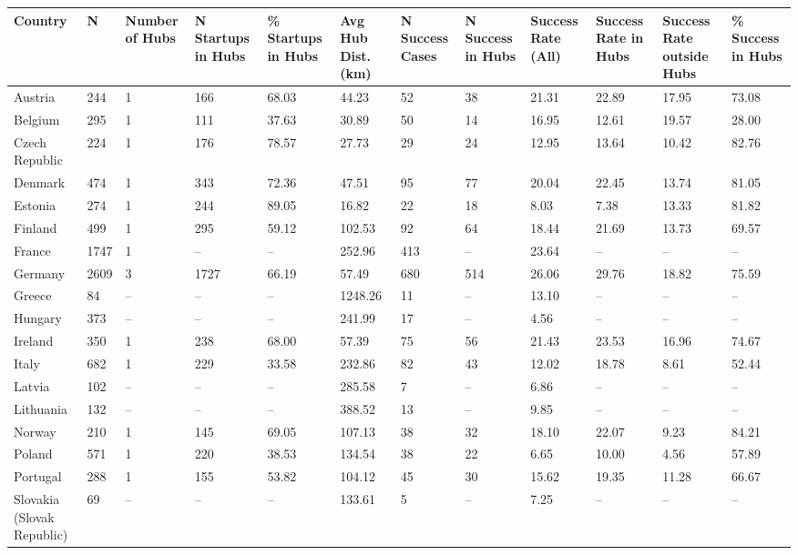 \begin{tabular}{llllllllllll}
  \toprule
Country & N & Number of Hubs & N Startups in Hubs & \% Startups in Hubs & Avg Hub Dist. (km) & N Success Cases & N Success in Hubs & Success Rate (All) & Success Rate in Hubs & Success Rate outside Hubs & \% Success in Hubs \\ 
  \midrule
Austria & 244 & 1 & 166 & 68.03 & 44.23 & 52 & 38 & 21.31 & 22.89 & 17.95 & 73.08 \\ 
  Belgium & 295 & 1 & 111 & 37.63 & 30.89 & 50 & 14 & 16.95 & 12.61 & 19.57 & 28.00 \\ 
  Czech Republic & 224 & 1 & 176 & 78.57 & 27.73 & 29 & 24 & 12.95 & 13.64 & 10.42 & 82.76 \\ 
  Denmark & 474 & 1 & 343 & 72.36 & 47.51 & 95 & 77 & 20.04 & 22.45 & 13.74 & 81.05 \\ 
  Estonia & 274 & 1 & 244 & 89.05 & 16.82 & 22 & 18 & 8.03 & 7.38 & 13.33 & 81.82 \\ 
  Finland & 499 & 1 & 295 & 59.12 & 102.53 & 92 & 64 & 18.44 & 21.69 & 13.73 & 69.57 \\ 
  France & 1747 & 1 & – & – & 252.96 & 413 & – & 23.64 & – & – & – \\ 
  Germany & 2609 & 3 & 1727 & 66.19 & 57.49 & 680 & 514 & 26.06 & 29.76 & 18.82 & 75.59 \\ 
  Greece & 84 & – & – & – & 1248.26 & 11 & – & 13.10 & – & – & – \\ 
  Hungary & 373 & – & – & – & 241.99 & 17 & – & 4.56 & – & – & – \\ 
  Ireland & 350 & 1 & 238 & 68.00 & 57.39 & 75 & 56 & 21.43 & 23.53 & 16.96 & 74.67 \\ 
  Italy & 682 & 1 & 229 & 33.58 & 232.86 & 82 & 43 & 12.02 & 18.78 & 8.61 & 52.44 \\ 
  Latvia & 102 & – & – & – & 285.58 & 7 & – & 6.86 & – & – & – \\ 
  Lithuania & 132 & – & – & – & 388.52 & 13 & – & 9.85 & – & – & – \\ 
  Norway & 210 & 1 & 145 & 69.05 & 107.13 & 38 & 32 & 18.10 & 22.07 & 9.23 & 84.21 \\ 
  Poland & 571 & 1 & 220 & 38.53 & 134.54 & 38 & 22 & 6.65 & 10.00 & 4.56 & 57.89 \\ 
  Portugal & 288 & 1 & 155 & 53.82 & 104.12 & 45 & 30 & 15.62 & 19.35 & 11.28 & 66.67 \\ 
  Slovakia (Slovak Republic) & 69 & – & – & – & 133.61 & 5 & – & 7.25 & – & – & – \\ 

\end{tabular}
